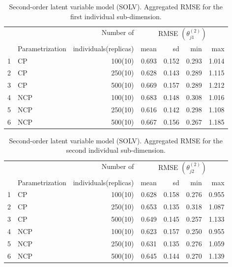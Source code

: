 %
\begin{table}[H]
	\centering
	\begin{tabular}{rlrrrrr}
		\hline
		\multicolumn{2}{c}{ } & Number of & \multicolumn{4}{c}{ RMSE $( \theta^{(2)}_{j1} )$ } \\ 
		\cmidrule(rl){4-7}
		& Parametrization & individuals(replicas) & mean & sd & min & max \\  
		\hline\hline
		1 & CP &  100(10) & 0.693 & 0.152 & 0.293 & 1.014 \\
		2 & CP &  250(10) & 0.628 & 0.143 & 0.289 & 1.115 \\  
		3 & CP &  500(10) & 0.669 & 0.157 & 0.289 & 1.212 \\ 
		\hline
		4 & NCP &  100(10) & 0.683 & 0.148 & 0.308 & 1.016 \\ 
		5 & NCP &  250(10) & 0.616 & 0.142 & 0.298 & 1.108 \\ 
		6 & NCP &  500(10) & 0.667 & 0.156 & 0.267 & 1.185 \\
		\hline
	\end{tabular}
	\caption[Second-order latent variable model (SOLV). Aggregated RMSE for the first individual sub-dimension.]%
	{Second-order latent variable model (SOLV). Aggregated RMSE for the first individual sub-dimension.}
	\label{tab:SOLV_RMSE_theta1}
\end{table}
%
\begin{table}[H]
	\centering
	\begin{tabular}{rlrrrrr}
		\hline
		\multicolumn{2}{c}{ } & Number of & \multicolumn{4}{c}{ RMSE $( \theta^{(2)}_{j2} )$ } \\ 
		\cmidrule(rl){4-7}
		& Parametrization & individuals(replicas) & mean & sd & min & max \\  
		\hline\hline
		1 & CP &  100(10) & 0.628 & 0.158 & 0.276 & 0.955 \\  
		2 & CP &  250(10) & 0.653 & 0.135 & 0.318 & 1.087 \\  
		3 & CP &  500(10) & 0.649 & 0.145 & 0.257 & 1.133 \\  
		\hline
		4 & NCP &  100(10) & 0.623 & 0.157 & 0.250 & 0.955 \\ 
		5 & NCP &  250(10) & 0.631 & 0.135 & 0.276 & 1.059 \\  
		6 & NCP &  500(10) & 0.645 & 0.144 & 0.270 & 1.139 \\  
		\hline
	\end{tabular}
	\caption[Second-order latent variable model (SOLV). Aggregated RMSE for the second individual sub-dimension.]%
	{Second-order latent variable model (SOLV). Aggregated RMSE for the second individual sub-dimension.}
	\label{tab:SOLV_RMSE_theta2}
\end{table}
